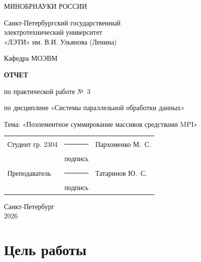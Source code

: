 \documentclass[14pt,a4paper]{extarticle}
\newcommand{\Ministry}{МИНОБРНАУКИ РОССИИ}
\newcommand{\University}{Санкт-Петербургский государственный\\
электротехнический университет\\
«ЛЭТИ» им. В.И. Ульянова (Ленина)}
\newcommand{\Department}{МОЭВМ}
\newcommand{\StudentName}{Пархоменко М.~С.}
\newcommand{\StudentGroup}{2304}
\newcommand{\TeacherName}{Татаринов Ю.~С.}
\newcommand{\City}{Санкт-Петербург}
\begin{document}
\begin{titlepage}
    \thispagestyle{empty}
    \begin{center}
        \Ministry

        \University

        Кафедра \Department
    \end{center}

    \vspace{2cm}

    \begin{center}
        \textbf{ОТЧЕТ}

        по практической работе №~3

        по дисциплине «Системы параллельной обработки данных»

        \vspace{0.5cm}
        Тема: «Поэлементное суммирование массивов средствами MPI»
    \end{center}

    \vspace{2cm}

    \begin{flushright}
        \begin{minipage}{0.8\textwidth}
            \begin{tabularx}{\linewidth}{@{}p{4.8cm}
                >{\centering\arraybackslash}p{2.8cm} X@{}}
                Студент гр. \StudentGroup
                & \rule{2.5cm}{0.4pt} & \StudentName\\
                & подпись & \\[0.8cm]
                Преподаватель
                & \rule{2.5cm}{0.4pt} & \TeacherName\\
                & подпись &
            \end{tabularx}
        \end{minipage}
    \end{flushright}

    \vfill

    \begin{center}
        \City\\
        2026
    \end{center}
\end{titlepage}

\setcounter{page}{2}

\section{Цель работы}
\end{document}
